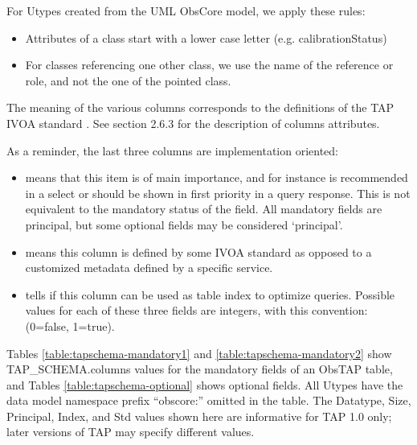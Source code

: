 \documentclass[11pt,a4paper]{ivoa}
\begin{document}
For Utypes created from the UML ObsCore model, we apply these rules:

\begin{itemize}
\item Attributes of a class start with a lower case letter (e.g. calibrationStatus)
\item For classes referencing one other class, we use the name of the reference or role, and not the one of the pointed
class.
\end{itemize}

The meaning of the various columns corresponds to the definitions of the TAP IVOA standard \citep{2010ivoa.spec.0327D}. See
section 2.6.3 for the description of columns attributes.

As a reminder, the last three columns are implementation oriented:

\begin{itemize}
\item[`principal':] means that this item is of main importance, and for instance is recommended in a select or should be
shown in first priority in a query response.
This is not equivalent to the mandatory status of the field. All mandatory fields are principal, but some optional
fields may be considered `principal'.

\item[`std':] means this column is defined by some IVOA standard as opposed to a customized metadata defined by a specific
service.

\item[`indexed':] tells if this column can be used as table index to optimize queries. Possible values for each of these
three fields are integers, with this convention: (0=false, 1=true).
\end{itemize}

Tables \ref{table:tapschema-mandatory1} and \ref{table:tapschema-mandatory2} show TAP\_SCHEMA.columns values for the mandatory fields of an ObsTAP table, and Tables \ref{table:tapschema-optional} shows optional fields. All Utypes have the data model
namespace prefix ``obscore:'' omitted in the table. The Datatype, Size, Principal, Index, and Std values shown here
are informative for TAP 1.0 only; later versions of TAP may specify different values.
\end{document}
